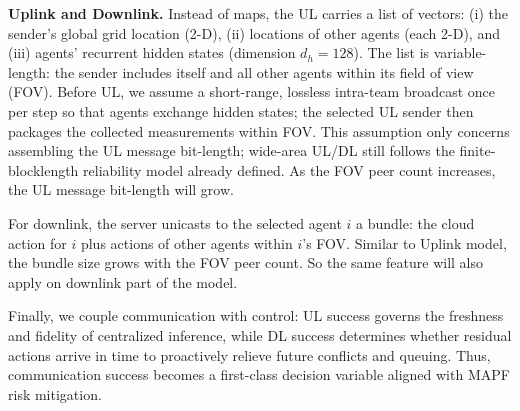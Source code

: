\documentclass[conference]{IEEEtran}
\begin{document}
\textbf{Uplink and Downlink.}
Instead of maps, the UL carries a list of vectors:
(i) the sender's global grid location (2-D),
(ii) locations of other agents (each 2-D),
and (iii) agents' recurrent hidden states (dimension $d_h=128$).
The list is variable-length: the sender includes itself and all other agents within its field of view (FOV). Before UL, we assume a short-range, lossless intra-team broadcast once per step so that agents
exchange hidden states; the selected UL sender then packages the collected measurements within FOV.
This assumption only concerns assembling the UL message bit-length; wide-area UL/DL still follows the
finite-blocklength reliability model already defined. As the FOV peer count increases, the UL message bit-length will grow.


For downlink, the server unicasts to the selected agent $i$ a bundle:
the cloud action for $i$ plus actions of other agents within $i$'s FOV.
Similar to Uplink model, the bundle size grows with the FOV peer count. So the same feature will also apply on downlink part of the model.

Finally, we couple communication with control: UL success governs the freshness and fidelity of centralized inference, while DL success determines whether residual actions arrive in time to proactively relieve future conflicts and queuing. Thus, communication success becomes a first-class decision variable aligned with MAPF risk mitigation. 


\end{document}
